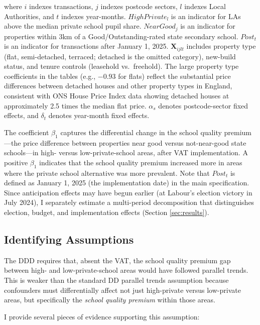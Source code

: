 \documentclass[12pt]{article}
\begin{document}
\noindent where $i$ indexes transactions, $j$ indexes postcode sectors, $l$ indexes Local Authorities, and $t$ indexes year-months. $HighPrivate_l$ is an indicator for LAs above the median private school pupil share. $NearGood_j$ is an indicator for properties within 3km of a Good/Outstanding-rated state secondary school. $Post_t$ is an indicator for transactions after January 1, 2025. $\mathbf{X}_{ijlt}$ includes property type (flat, semi-detached, terraced; detached is the omitted category), new-build status, and tenure controls (leasehold vs.\ freehold). The large property type coefficients in the tables (e.g., $-0.93$ for flats) reflect the substantial price differences between detached houses and other property types in England, consistent with ONS House Price Index data showing detached houses at approximately 2.5 times the median flat price. $\alpha_s$ denotes postcode-sector fixed effects, and $\delta_t$ denotes year-month fixed effects.

The coefficient $\beta_1$ captures the differential change in the school quality premium---the price difference between properties near good versus not-near-good state schools---in high- versus low-private-school areas, after VAT implementation. A positive $\beta_1$ indicates that the school quality premium increased more in areas where the private school alternative was more prevalent. Note that $Post_t$ is defined as January 1, 2025 (the implementation date) in the main specification. Since anticipation effects may have begun earlier (at Labour's election victory in July 2024), I separately estimate a multi-period decomposition that distinguishes election, budget, and implementation effects (Section \ref{sec:results}).

\subsection{Identifying Assumptions}

The DDD requires that, absent the VAT, the school quality premium gap between high- and low-private-school areas would have followed parallel trends. This is weaker than the standard DD parallel trends assumption because confounders must differentially affect not just high-private versus low-private areas, but specifically the \textit{school quality premium} within those areas.

I provide several pieces of evidence supporting this assumption:
\end{document}
